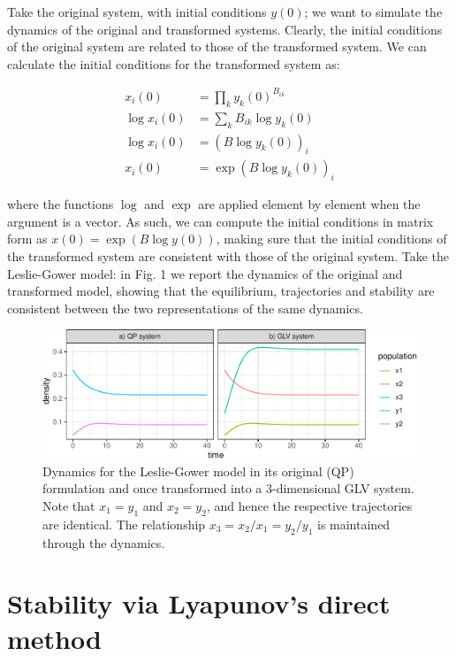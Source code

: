 \documentclass{article}
\begin{document}
Take the original system, with initial conditions \(y(0)\); we want to
simulate the dynamics of the original and transformed systems. Clearly,
the initial conditions of the original system are related to those of
the transformed system. We can calculate the initial conditions for the
transformed system as:

\begin{equation}
\begin{aligned}
x_i(0) &= \prod_{k} {y_k(0)}^{B_{ik}}\\
\log x_i(0) &= \sum_k B_{ik} \log y_k(0)\\
\log x_i(0) &= (B \log y_k(0))_i\\
x_i(0) &= \exp(B \log y_k(0))_i
\end{aligned}
\end{equation}

where the functions \(\log\) and \(\exp\) are applied element by element
when the argument is a vector. As such, we can compute the initial
conditions in matrix form as \(x(0) = \exp(B \log y(0))\), making sure
that the initial conditions of the transformed system are consistent
with those of the original system. Take the Leslie-Gower model: in Fig.
1 we report the dynamics of the original and transformed model, showing
that the equilibrium, trajectories and stability are consistent between
the two representations of the same dynamics.

\begin{figure}
\centering
\includegraphics{GLV_embedding_files/figure-latex/fig1-1.pdf}
\caption{Dynamics for the Leslie-Gower model in its original (QP)
formulation and once transformed into a 3-dimensional GLV system. Note
that \(x_1 = y_1\) and \(x_2 = y_2\), and hence the respective
trajectories are identical. The relationship
\(x_3 = x_2 / x_1= y_2 / y_1\) is maintained through the dynamics.}
\end{figure}

\hypertarget{stability-via-lyapunovs-direct-method}{%
\section{Stability via Lyapunov's direct
method}\label{stability-via-lyapunovs-direct-method}}
\end{document}
